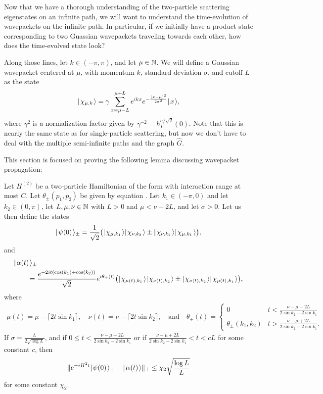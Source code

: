 \documentclass[../thesis-main/thesis-main]{subfiles}
\begin{document}
Now that we have a thorough understanding of the two-particle scattering eigenstates on an infinite path, we will want to understand the time-evolution of wavepackets on the infinite path.  In particular, if we initially have a product state corresponding to two Guassian wavepackets traveling towards each other, how does the time-evolved state look?

Along those lines, let $k\in(-\pi,\pi)$, and let $\mu \in \mathbb{N}$.  We will define a Gaussian wavepacket centered at $\mu$, with momentum $k$, standard deviation $\sigma$, and cutoff $L$ as the state
\begin{align}
  |\mspace{2mu} \chi_{\mu,k} \mspace{2mu} \rangle = \gamma \sum_{x=\mu-L}^{\mu+L} e^{i k x} e^{ -\frac{(x-\mu)^2}{2\sigma^2}} |\mspace{2mu} x \mspace{2mu} \rangle,
\end{align}
where $\gamma^2$ is a normalization factor given by $\gamma^{-2} = h_L^{\sigma/\sqrt{2}}(0)$.  Note that this is nearly the same state as for single-particle scattering, but now we don't have to deal with the multiple semi-infinite paths and the graph $\widehat{G}$.

This section is focused on proving the following lemma discussing wavepacket propagation:
\begin{theorem}
Let $H^{(2)}$ be a two-particle Hamiltonian of the form  with interaction range at most $C$.  Let $\theta_{\pm}(p_1,p_2)$ be given by equation .  Let $k_1\in (-\pi,0)$ and let $k_2 \in (0,\pi)$, let $L,\mu, \nu \in \mathbb{N}$ with $L>0$ and $\mu < \nu - 2 L$, and let $\sigma > 0$.  Let us then define the states
\begin{align}
  |\mspace{2mu} \psi(0) \mspace{2mu} \rangle_{\pm} = \frac{1}{\sqrt{2}} \big( |\mspace{2mu} \chi_{\mu, k_1} \mspace{2mu} \rangle |\mspace{2mu} \chi_{\nu, k_2} \mspace{2mu} \rangle \pm  |\mspace{2mu} \chi_{\nu,k_2} \mspace{2mu} \rangle|\mspace{2mu} \chi_{\mu,k_1} \mspace{2mu} \rangle\big),
\end{align}
and 
\begin{align}
  &|\mspace{2mu} \alpha (t) \mspace{2mu} \rangle_{\pm} \nonumber\\
  &\qquad= \frac{e^{-2 i t (\cos(k_1) + \cos(k_2))}}{\sqrt{2}} 
    e^{i \theta_{\pm}(t)} \big( |\mspace{2mu} \chi_{\mu(t),k_1} \mspace{2mu} \rangle|\mspace{2mu} \chi_{\nu(t),k_2} \mspace{2mu} \rangle  \pm |\mspace{2mu} \chi_{\nu(t),k_2} \mspace{2mu} \rangle|\mspace{2mu} \chi_{\mu(t),k_1} \mspace{2mu} \rangle\big) ,
\end{align}
where
\begin{align}
  \mu(t) = \mu - \lceil 2 t \sin k_1\rceil, \quad
  \nu(t) = \nu - \lceil 2 t \sin k_2\rceil, \quad \text{and} \quad 
  \theta_{\pm}(t)=\begin{cases}0 & t < \frac{ \nu - \mu - 2 L}{2 \sin k_2 - 2\sin k_1}\\
  \theta_{\pm}(k_1,k_2)& t > \frac{\nu - \mu + 2 L}{2 \sin k_2 - 2 \sin k_1}.\end{cases}
\end{align}
If $\sigma = \frac{ L}{2\sqrt{\log L}}$, and if $0 \leq t < \frac{ \nu - \mu - 2 L}{2 \sin k_2 - 2\sin k_1}$ or if $\frac{\nu - \mu + 2L}{2 \sin k_2 - 2\sin k_1}< t < c L$ for some constant $c$, then 
\begin{align}
  \|{e^{ - i H^2 t} |\mspace{2mu} \psi(0) \mspace{2mu} \rangle_{\pm} - |\mspace{2mu} \alpha(t) \mspace{2mu} \rangle}\|_{\pm} \leq \chi_2 \sqrt{\frac{\log L}{L}}
\end{align}
for some constant $\chi_2$.
\label{thm:two_particle_wavepacket_bound}
\end{theorem}
\end{document}
